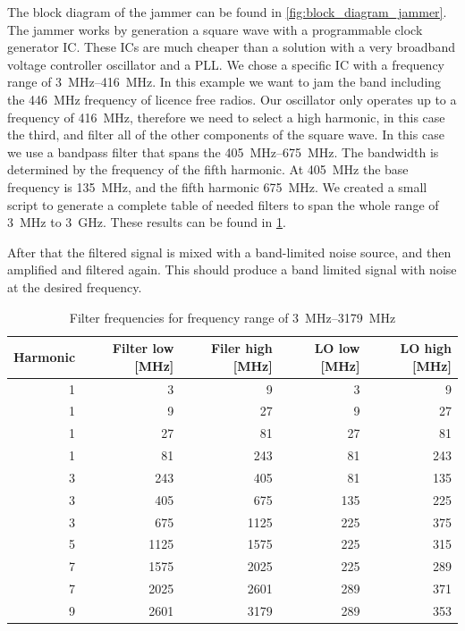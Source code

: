 \documentclass[a4paper, openany, oneside]{memoir}
\begin{document}
The block diagram of the jammer can be found in \cref{fig:block_diagram_jammer}. The jammer works by generation a square wave with a programmable clock generator IC\@. These ICs are much cheaper than a solution with a very broadband voltage controller oscillator and a PLL\@. We chose a specific IC with a frequency range of \SIrange{3}{416}{\mega\hertz}. In this example we want to jam the band including the \SI{446}{\mega\hertz} frequency of licence free radios. Our oscillator only operates up to a frequency of \SI{416}{\mega\hertz}, therefore we need to select a high harmonic, in this case the third, and filter all of the other components of the square wave. In this case we use a bandpass filter that spans the \SIrange{405}{675}{\mega\hertz}. The bandwidth is determined by the frequency of the fifth harmonic. At \SI{405}{\mega\hertz} the base frequency is \SI{135}{\mega\hertz}, and the fifth harmonic \SI{675}{\mega\hertz}. We created a small script to generate a complete table of needed filters to span the whole range of \SI{3}{\mega\hertz} to \SI{3}{\giga\hertz}. These results can be found in \cref{tbl:filter_freqs}.

After that the filtered signal is mixed with a band-limited noise source, and then amplified and filtered again. This should produce a band limited signal with noise at the desired frequency.

\begin{table}[h]
\centering
\caption{Filter frequencies for frequency range of \SIrange{3}{3179}{\mega\hertz}}
\label{tbl:filter_freqs}
\begin{tabular}{rrrrr}
\toprule
   Harmonic &   Filter low [\si{\mega\hertz}] &   Filer high [\si{\mega\hertz}] &   LO low [\si{\mega\hertz}] &   LO high [\si{\mega\hertz}] \\
\midrule
          1 &            3 &            9 &        3 &         9 \\
          1 &            9 &           27 &        9 &        27 \\
          1 &           27 &           81 &       27 &        81 \\
          1 &           81 &          243 &       81 &       243 \\
          3 &          243 &          405 &       81 &       135 \\
          3 &          405 &          675 &      135 &       225 \\
          3 &          675 &         1125 &      225 &       375 \\
          5 &         1125 &         1575 &      225 &       315 \\
          7 &         1575 &         2025 &      225 &       289 \\
          7 &         2025 &         2601 &      289 &       371 \\
          9 &         2601 &         3179 &      289 &       353 \\
\bottomrule
\end{tabular}
\end{table}
\end{document}
